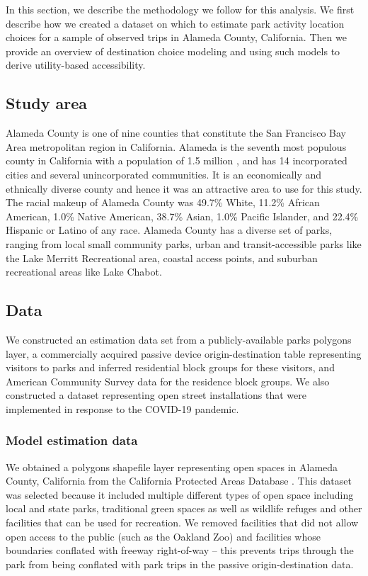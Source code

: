 \documentclass[3p, authoryear, review]{elsarticle} %
\begin{document}
In this section, we describe the methodology we follow for this analysis.
We first describe how we created a dataset on which to estimate park activity location
choices for a sample of observed trips in Alameda County, California. Then we
provide an overview of destination choice modeling and using such models to derive
utility-based accessibility.

\hypertarget{study-area}{%
\subsection{Study area}\label{study-area}}

Alameda County is one of nine counties that constitute the San Francisco Bay
Area metropolitan region in California. Alameda is the seventh most populous
county in California with a population of 1.5 million \citep{alamedafacts}, and has
14 incorporated cities and several unincorporated communities. It is an
economically and ethnically diverse county and hence it was an attractive area
to use for this study. The racial makeup of Alameda County was 49.7\% White,
11.2\% African American, 1.0\% Native American, 38.7\% Asian, 1.0\% Pacific
Islander, and 22.4\% Hispanic or Latino of any race. Alameda County has a
diverse set of parks, ranging from local small community parks, urban and
transit-accessible parks like the Lake Merritt Recreational area,
coastal access points, and suburban recreational areas like Lake Chabot.

\hypertarget{data}{%
\subsection{Data}\label{data}}

We constructed an estimation data set from a
publicly-available parks polygons layer, a commercially acquired passive device
origin-destination table representing visitors to parks and inferred residential
block groups for these visitors,
and American Community Survey data for the residence block groups. We also
constructed a dataset representing open street installations that were
implemented in response to the COVID-19 pandemic.

\hypertarget{model-estimation-data}{%
\subsubsection{Model estimation data}\label{model-estimation-data}}

We obtained a polygons shapefile layer representing open spaces in Alameda
County, California from the California Protected Areas Database \citep{cpad2019}.
This dataset was selected because it included multiple different types of open
space including local and state parks, traditional green spaces as well as
wildlife refuges and other facilities that can be used for recreation. We
removed facilities that did not allow open access to the public (such as the
Oakland Zoo) and facilities whose boundaries conflated with freeway right-of-way
-- this prevents trips through the park from being conflated with park trips in
the passive origin-destination data.
\end{document}
